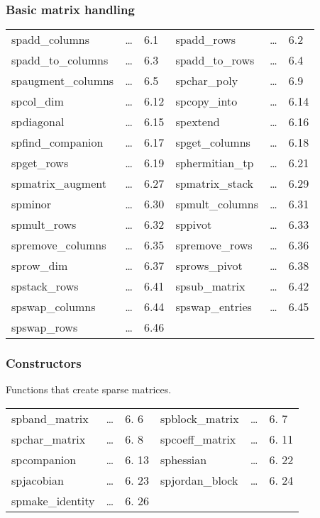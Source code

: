 \subsubsection{Basic matrix handling}
\begin{center}
\begin{tabular}{l l l l l l}
spadd\_columns     & \ldots & 6.1  & 
spadd\_rows        & \ldots & 6.2  \\
spadd\_to\_columns & \ldots & 6.3  &
spadd\_to\_rows    & \ldots & 6.4  \\
spaugment\_columns & \ldots & 6.5  &
spchar\_poly       & \ldots & 6.9  \\
spcol\_dim      & \ldots & 6.12  &
spcopy\_into       & \ldots & 6.14 \\
spdiagonal         & \ldots & 6.15 &
spextend           & \ldots & 6.16 \\
spfind\_companion  & \ldots & 6.17  &
spget\_columns     & \ldots & 6.18 \\
spget\_rows        & \ldots & 6.19 &
sphermitian\_tp    & \ldots & 6.21 \\
spmatrix\_augment  & \ldots & 6.27 &
spmatrix\_stack    & \ldots & 6.29 \\
spminor            & \ldots & 6.30 &
spmult\_columns    & \ldots & 6.31 \\ 
spmult\_rows       & \ldots & 6.32 &
sppivot            & \ldots & 6.33 \\
spremove\_columns  & \ldots & 6.35 &
spremove\_rows     & \ldots & 6.36 \\
sprow\_dim         & \ldots & 6.37 &
sprows\_pivot      & \ldots & 6.38 \\
spstack\_rows      & \ldots & 6.41 &
spsub\_matrix      & \ldots & 6.42 \\
spswap\_columns    & \ldots & 6.44 &
spswap\_entries    & \ldots & 6.45 \\
spswap\_rows       & \ldots & 6.46 &
\end{tabular}
\end{center}

\subsubsection{Constructors}

Functions that create sparse matrices.

\begin{center}
\begin{tabular}{l l l l l l}
spband\_matrix       & \ldots & 6. 6 & 
spblock\_matrix      & \ldots & 6. 7 \\
spchar\_matrix       & \ldots & 6. 8 & 
spcoeff\_matrix      & \ldots & 6. 11 \\ 
spcompanion          & \ldots & 6. 13 & 
sphessian            & \ldots & 6. 22 \\
spjacobian           & \ldots & 6. 23 &
spjordan\_block      & \ldots & 6. 24 \\ 
spmake\_identity     & \ldots & 6. 26 &
\end{tabular}
\end{center}

